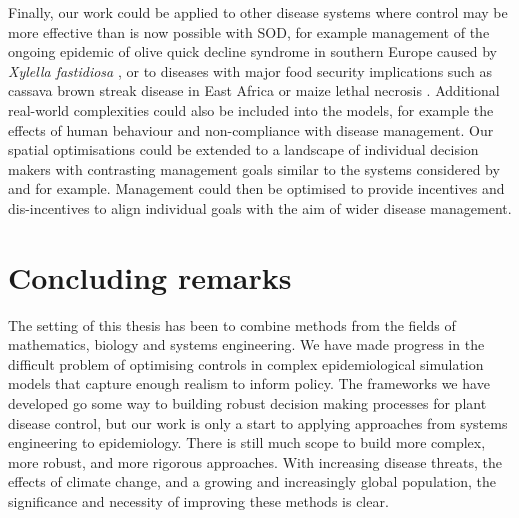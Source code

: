 Finally, our work could be applied to other disease systems where control may be more effective than is now possible with SOD, for example management of the ongoing epidemic of olive quick decline syndrome in southern Europe caused by \emph{Xylella fastidiosa} \citep{sicard_xylella_2018}, or to diseases with major food security implications such as cassava brown streak disease in East Africa \citep{legg_comparing_2011} or maize lethal necrosis \citep{hilker_modeling_2017}. Additional real-world complexities could also be included into the models, for example the effects of human behaviour and non-compliance with disease management. Our spatial optimisations could be extended to a landscape of individual decision makers with contrasting management goals similar to the systems considered by \citet{epanchin_social_2010} and \citet{milne_effect_2015} for example. Management could then be optimised to provide incentives and dis-incentives to align individual goals with the aim of wider disease management.

\section{Concluding remarks}

The setting of this thesis has been to combine methods from the fields of mathematics, biology and systems engineering. We have made progress in the difficult problem of optimising controls in complex epidemiological simulation models that capture enough realism to inform policy. The frameworks we have developed go some way to building robust decision making processes for plant disease control, but our work is only a start to applying approaches from systems engineering to epidemiology. There is still much scope to build more complex, more robust, and more rigorous approaches. With increasing disease threats, the effects of climate change, and a growing and increasingly global population, the significance and necessity of improving these methods is clear.
